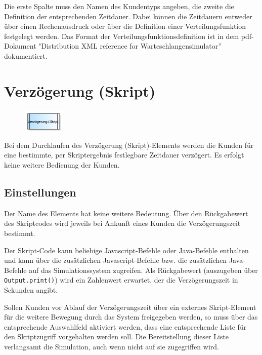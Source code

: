 Die erste Spalte muss den Namen des Kundentyps angeben, die zweite die Definition der entsprechenden Zeitdauer.
Dabei können die Zeitdauern entweder über einen Rechenausdruck oder über die Definition einer
Verteilungsfunktion festgelegt werden. Das Format der Verteilungsfunktionsdefinition ist in dem pdf-Dokument
"Distribution XML reference for Warteschlangensimulator'' dokumentiert.


\section{Verzögerung (Skript)}
\label{ref:ModelElementDelayJS}

\begin{figure}
\vspace{-22pt}
\includegraphics[width=2cm]{imageModelElementDelayJS.png}
\vspace{-22pt}
\end{figure}

Bei dem Durchlaufen des Verzögerung (Skript)-Elements werden die Kunden für eine bestimmte, per Skriptergebnis
festlegbare Zeitdauer verzögert. Es erfolgt keine weitere Bedienung der Kunden.

\subsection*{Einstellungen}

Der Name des Elements hat keine weitere Bedeutung. Über den Rückgabewert des Skriptcodes
wird jeweils bei Ankunft eines Kunden die Verzögerungszeit bestimmt.

Der Skript-Code kann beliebige Javascript-Befehle oder Java-Befehle enthalten
und kann über die zusätzlichen Javascript-Befehle bzw.
die zusätzlichen Java-Befehle auf das Simulationssystem
zugreifen. Als Rückgabewert (auszugeben über \texttt{Output.print()}) wird ein Zahlenwert
erwartet, der die Verzögerungszeit in Sekunden angibt.

Sollen Kunden vor Ablauf der Verzögerungszeit über ein externes Skript-Element für die weitere Bewegung durch das System
freigegeben werden, so muss über das entsprechende Auswahlfeld aktiviert werden, dass eine entsprechende Liste für den
Skriptzugriff vorgehalten werden soll. Die Bereitstellung dieser Liste verlangsamt die Simulation, auch wenn nicht auf
sie zugegriffen wird.





